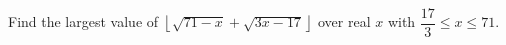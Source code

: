 Find the largest value of $\left\lfloor\sqrt{71-x}+\sqrt{3x-17}\right\rfloor$ over real $x$ with $\dfrac{17}3\le x\le71$.
